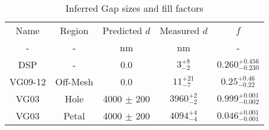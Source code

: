 \begin{table}[h!]
\caption{Inferred Gap sizes and fill factors \label{tbl_DerivedGapSizes}}
\begin{center}
    \begin{tabular}{ c c c c c }
    \hline
    Name & Region & Predicted $d$ & Measured $d$ & $f$ \\
    -  & - & nm & nm & - \\
    \hline
    DSP & -    &   0.0  & $3^{+8}_{-2}$ & $0.260^{+0.456}_{-0.230}$\\
    VG09-12 & Off-Mesh    &   0.0  & $11^{+21}_{-7}$ & $0.25^{+0.46}_{-0.22}$\\
    VG03 & Hole    &   4000 $\pm$ 200  & $3960^{+2}_{-2}$ &  $0.999^{+0.001}_{-0.002}$\\
    VG03 & Petal   &   4000 $\pm$ 200  & $4094^{+4}_{-4}$ &  $0.046^{+0.001}_{-0.001}$\\
    \hline
    \end{tabular}
\end{center}
\end{table}